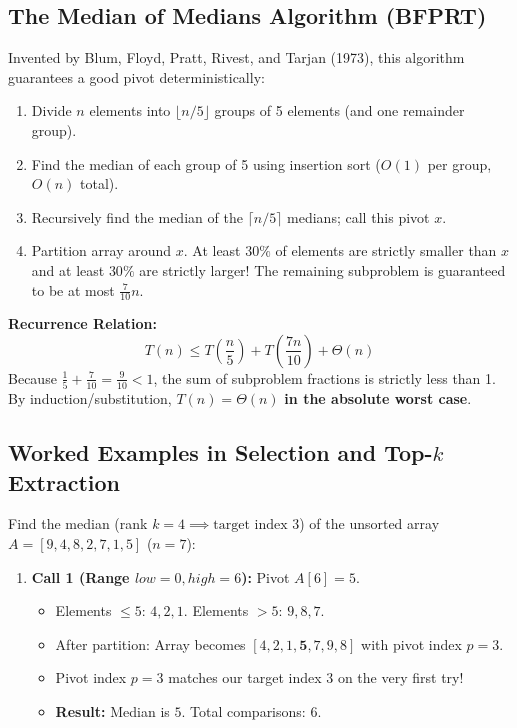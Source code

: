 \documentclass[11pt,a4paper]{article}
\begin{document}
\subsection{The Median of Medians Algorithm (BFPRT)}
Invented by Blum, Floyd, Pratt, Rivest, and Tarjan (1973), this algorithm guarantees a good pivot deterministically:
\begin{enumerate}[itemsep=1pt]
    \item Divide $n$ elements into $\lfloor n/5 \rfloor$ groups of 5 elements (and one remainder group).
    \item Find the median of each group of 5 using insertion sort ($O(1)$ per group, $O(n)$ total).
    \item Recursively find the median of the $\lceil n/5 \rceil$ medians; call this pivot $x$.
    \item Partition array around $x$. At least $30\%$ of elements are strictly smaller than $x$ and at least $30\%$ are strictly larger! The remaining subproblem is guaranteed to be at most $\frac{7}{10}n$.
\end{enumerate}
\textbf{Recurrence Relation:}
\[
T(n) \le T\left(\frac{n}{5}\right) + T\left(\frac{7n}{10}\right) + \Theta(n)
\]
Because $\frac{1}{5} + \frac{7}{10} = \frac{9}{10} < 1$, the sum of subproblem fractions is strictly less than 1. By induction/substitution, $T(n) = \Theta(n)$ \textbf{in the absolute worst case}.

\subsection{Worked Examples in Selection and Top-\texorpdfstring{$k$}{k} Extraction}

\begin{examplebox}
Find the median (rank $k = 4 \implies \text{target index } 3$) of the unsorted array $A = [9, 4, 8, 2, 7, 1, 5]$ ($n = 7$):
\begin{enumerate}[itemsep=2pt]
    \item \textbf{Call 1 (Range $low = 0, high = 6$):} Pivot $A[6] = 5$.
    \begin{itemize}[itemsep=1pt]
        \item Elements $\le 5$: $4, 2, 1$. Elements $> 5$: $9, 8, 7$.
        \item After partition: Array becomes $[4, 2, 1, \mathbf{5}, 7, 9, 8]$ with pivot index $p = 3$.
        \item Pivot index $p = 3$ matches our target index $3$ on the very first try!
        \item \textbf{Result:} Median is $5$. Total comparisons: 6.
    \end{itemize}
\end{enumerate}
\end{examplebox}
\end{document}
